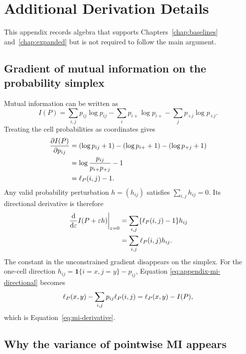 \chapter{Additional Derivation Details}
\label{app:derivation-details}

This appendix records algebra that supports Chapters~\ref{chap:baselines}
and~\ref{chap:expanded} but is not required to follow the main argument.

\section{Gradient of mutual information on the probability simplex}

Mutual information can be written as
\begin{equation}
  I(P)
  =\sum_{i,j}p_{ij}\log p_{ij}
  -\sum_i p_{i+}\log p_{i+}
  -\sum_j p_{+j}\log p_{+j}.
  \label{eq:appendix-mi-entropy-form}
\end{equation}
Treating the cell probabilities as coordinates gives
\begin{align}
  \frac{\partial I(P)}{\partial p_{ij}}
  &=(\log p_{ij}+1)
    -(\log p_{i+}+1)
    -(\log p_{+j}+1)\\
  &=\log\frac{p_{ij}}{p_{i+}p_{+j}}-1\\
  &=\ell_P(i,j)-1.
  \label{eq:appendix-mi-gradient}
\end{align}
Any valid probability perturbation $h=(h_{ij})$ satisfies
$\sum_{i,j}h_{ij}=0$. Its directional derivative is therefore
\begin{align}
  \left.\frac{\mathrm d}{\mathrm d\varepsilon}
  I(P+\varepsilon h)\right|_{\varepsilon=0}
  &=\sum_{i,j}\{\ell_P(i,j)-1\}h_{ij}\\
  &=\sum_{i,j}\ell_P(i,j)h_{ij}.
  \label{eq:appendix-mi-directional}
\end{align}
The constant in the unconstrained gradient disappears on the simplex. For
the one-cell direction $h_{ij}=\mathbf 1\{i=x,j=y\}-p_{ij}$, Equation
\eqref{eq:appendix-mi-directional} becomes
\begin{equation}
  \ell_P(x,y)-\sum_{i,j}p_{ij}\ell_P(i,j)
  =\ell_P(x,y)-I(P),
\end{equation}
which is Equation~\eqref{eq:mi-derivative}.

\section{Why the variance of pointwise MI appears}

